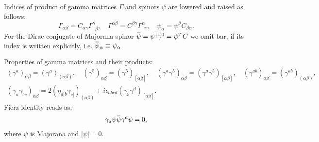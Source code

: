 \documentclass[a4paper,12pt]{article}
\numberwithin{equation}{section} %
\newcommand{\p}[1]{|#1|}
\numberwithin{equation}{section}
\newcommand{\overbar}[1]{\mkern 1.5mu\overline{\mkern-1.5mu#1\mkern-1.5mu}\mkern 1.5mu}
\newcommand{\psibar}{\overbar{\psi}}
\begin{document}
\begin{appendix}
Indices of product of gamma matrices $\Gamma$ and spinors $\psi$ are lowered and raised as follows:
\begin{equation}
    \Gamma_{\alpha\beta} = C_{\alpha\gamma}\Gamma^\gamma_{\enspace\beta}, \quad \Gamma^{\alpha\beta} = C^{\beta\gamma}\Gamma^\alpha_{\enspace\gamma}, \quad \psi_\alpha = \psi^\beta C_{\beta\alpha}.
\end{equation}
For the Dirac conjugate of Majorana spinor $\psibar = \psi^\dagger\gamma^0 = \psi^T C$ we omit bar, if its index is written explicitly, i.e. $\psibar_\alpha\equiv \psi_\alpha$.

Properties of gamma matrices and their products:
\begin{equation}\label{Gamma matrix symmetry properties}
\begin{gathered}
    (\gamma^a)_{\alpha\beta} =  (\gamma^a)_{(\alpha\beta)}, \quad  (\gamma^5)_{\alpha\beta}=(\gamma^5)_{[\alpha\beta]}, \quad (\gamma^a\gamma^5)_{\alpha\beta}=(\gamma^a\gamma^5)_{[\alpha\beta]}, \quad (\gamma^{ab})_{\alpha\beta} =  (\gamma^{ab})_{(\alpha\beta)},\\
    (\gamma_a\gamma_{bc})_{\alpha\beta} = 2(\eta_{a[b}\gamma_{c]})_{(\alpha\beta)} + i \epsilon_{abcd}(\gamma_5\gamma^d)_{[\alpha\beta]}.
\end{gathered}
\end{equation}
Fierz identity reads as:%
\begin{equation}\label{Fierz identity}
    \gamma_a\psi \psibar \gamma^a\psi = 0, 
\end{equation}
where $\psi$ is Majorana and $\p{\psi} = 0$.




\end{appendix}
\end{document}

